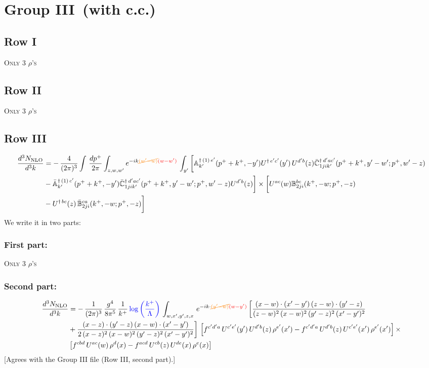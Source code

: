 \documentclass[9pt]{article}
\def\mf#1{\mathbb{#1}}
\numberwithin{equation}{section}
\begin{document}
\section{Group III\, (with c.c.)}
\subsection{Row I}
\textsc{Only 3 $\rho$'s}
\subsection{Row II}
\textsc{Only 3 $\rho$'s}
 \subsection{Row III}
 \begin{align}
    \frac{d^{3}N_{\rm NLO}}{d^{3}k} & =   -\,\frac{4}{(2\pi)^{3}} \int\, \frac{dp^{+}}{2\pi}\int_{z,w,w^{\prime}} e^{-ik{\color{orange}\cancel{(w^{\prime}-w)}}{\color{red}(w-w^{\prime})}}\,\int_{y^{\prime}}\bigg[\mf{A}^{\dagger\, (1)\,e^{\prime}}_{k^{\prime}}(p^{+}+k^{+},-y^{\prime})U^{\dagger\, e^{\prime}c^{\prime}}(y^{\prime})\,U^{d^{\prime}b}(z) \Bar{\mf{C}}^{\dagger\, d^{\prime}ac^{\prime}}_{1jik^{\prime}}(p^{+}+k^{+},y^{\prime}-w^{\prime}; p^{+},w^{\prime}-z)\notag \\ &  -\Bar{\mf{A}}^{\dagger\, (1)\,c^{\prime}}_{k^{\prime}}(p^{+}+k^{+},-y^{\prime}) \Bar{\mf{C}}^{\dagger\, d^{\prime}ac^{\prime}}_{1jik^{\prime}}(p^{+}+k^{+},y^{\prime}-w^{\prime}; p^{+},w^{\prime}-z)U^{d^{\prime}b}(z)\bigg] \times \bigg[U^{ac}(w) \mf{B}^{bc}_{2ji}(k^{+},-w;p^{+},-z)\notag \\ &  -U^{\dagger\, bc}(z)\,\Bar{\mf{B}}^{ca}_{2ji}(k^{+},-w; p^{+},-z)\bigg]\nonumber
\end{align}
We write it in two parts:
\subsubsection{First part:}
\textsc{Only 3 $\rho$'s}
\subsubsection{Second part:}
\begin{align}
 \frac{d^{3}N_{\rm NLO}}{d^{3}k} & =  -\, \frac{1}{(2\pi)^{3}}\,\frac{g^{4}}{8\pi^{5}}\,\frac{1}{k^{+}}\,{\color{blue}\log{\left(\frac{k^{+}}{\Lambda}\right)}}\,\int_{w,x',y',z,x}\, e^{-ik\cdot {\color{orange}\cancel{(y'-w)}}{\color{red}(w-y')}}\,\bigg[\frac{(x-w)\cdot (x'-y')\,(z-w)\cdot (y'-z)}{(z-w)^{2}\,(x-w)^{2}\,(y'-z)^{2}\,(x'-y')^{2}}\notag \\ & +\frac{(x-z)\cdot (y'-z)\,(x-w)\cdot (x'-y')}{2\,(x-z)^{2}\,(x-w)^{2}\,(y'-z)^{2}\,(x'-y')^{2}}\bigg]\, \left[f^{c'd'a}\,U^{c'e'}(y')\,U^{d'b}(z)\,\rho^{e'}(x')-f^{c'd'a}\, 
    U^{d'b}(z)\,U^{c'e'}(x')\,\rho^{e'}(x')\right]\times\notag \\ &  \left[f^{cbd}\,U^{ac}(w)\,\rho^{d}(x) -f^{acd}\,U^{cb}(z)\,U^{de}(x)\,\rho^{e}(x)\right] 
\end{align} {\color{red}[Agrees with the Group III file (Row III, second part).]}\par\noindent
\end{document}
